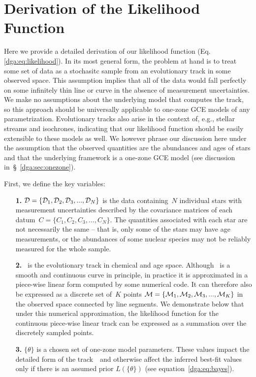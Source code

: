 

\chapter{Derivation of the Likelihood Function}
\label{dga:sec:likelihood}

Here we provide a detailed derivation of our likelihood function (Eq.
\ref{dga:eq:likelihood}).
In its most general form, the problem at hand is to treat some set of data as a
stochasitc sample from an evolutionary track in some observed space.
This assumption implies that all of the data would fall perfectly on some
infinitely thin line or curve in the absence of measurement uncertainties.
We make no assumptions about the underlying model that computes the track, so
this approach should be universally applicable to one-zone GCE models of any
parametrization.
Evolutionary tracks also arise in the context of, e.g., stellar streams and
isochrones, indicating that our likelihood function should be easily extensible
to these models as well.
We however phrase our discussion here under the assumption that the observed
quantities are the abundances and ages of stars and that the underlying
framework is a one-zone GCE model (see discussion in~\S~\ref{dga:sec:onezone}).
\par
First, we define the key variables:
\begin{itemize}

	\item[\textbf{1.}] $\mathcal{D} = \{\mathcal{D}_1, \mathcal{D}_2,
	\mathcal{D}_3, ..., \mathcal{D}_N\}$ is the data containing~$N$ individual
	stars with measurement uncertainties described by the covariance matrices
	of each datum~$C = \{C_1, C_2, C_3, ..., C_N\}$.
	The quantities associated with each star are not necessarily the same --
	that is, only some of the stars may have age measurements, or the
	abundances of some nuclear species may not be reliably measured for the
	whole sample.

	\item[\textbf{2.}] ~is the evolutionary track in chemical and age
	space.
	Although~ is a smooth and continuous curve in principle, in
	practice it is approximated in a piece-wise linear form computed by some
	numerical code.
	It can therefore also be expressed as a discrete set of~$K$ points
	$\mathcal{M} = \{\mathcal{M}_1, \mathcal{M}_2, \mathcal{M}_3, ...,
	\mathcal{M}_K\}$ in the observed space connected by line segments.
	We demonstrate below that under this numerical approximation, the
	likelihood function for the continuous piece-wise linear track can be
	expressed as a summation over the discretely sampled points.

	\item[\textbf{3.}] $\{\theta\}$ is a chosen set of one-zone model
	parameters.
	These values impact the detailed form of the track~~and otherwise
	affect the inferred best-fit values only if there is an assumed prior
	$L(\{\theta\})$ (see equation~\ref{dga:eq:bayes}).

\end{itemize}
